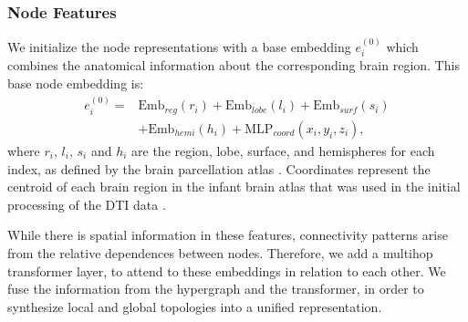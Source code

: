 \documentclass[sigconf, review]{acmart}
\begin{document}



        

\subsubsection{Node Features}
We initialize the node representations with a base embedding $e_i^{(0)}$ which combines the anatomical information about the corresponding brain region. This base node embedding is:
    \begin{equation}
        \begin{split}
            e_i^{(0)} = {} & \text{Emb}_{reg}(r_i) + \text{Emb}_{lobe}(l_i) + \text{Emb}_{surf}(s_i) \\
            & + \text{Emb}_{hemi}(h_i) + \text{MLP}_{coord}(x_i, y_i, z_i),
        \end{split}
    \end{equation}
where $r_i$, $l_i$, $s_i$ and $h_i$ are the region, lobe, surface, and hemispheres for each index, as defined by the brain parcellation atlas \cite{taoudi2022predicting}.
Coordinates represent the centroid of each brain region in the infant brain atlas that was used in the initial processing of the DTI data \cite{shi2011infant, schuh2018unbiased}.

While there is spatial information in these features, connectivity patterns arise from the relative dependences between nodes. Therefore, we add a multihop transformer layer, to attend to these embeddings in relation to each other. We fuse the information from the hypergraph and the transformer, in order to synthesize local and global topologies into a unified representation. 
\end{document}
